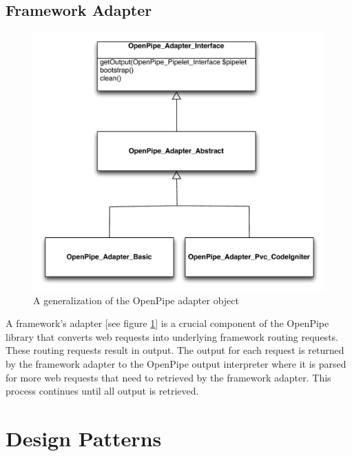 \documentclass[12pt]{report}
\begin{document}
\section{Framework Adapter}

\begin{figure}[H]
\label{fig:generalizationAdapter}
\centering
\includegraphics[width=\textwidth,keepaspectratio]{figures/images/generalization_adapters.pdf}
\caption{A generalization of the OpenPipe adapter object}
\end{figure}

A framework's adapter [see figure \ref{fig:generalizationAdapter}]  is a crucial component of the OpenPipe library that converts web requests into underlying framework routing requests. These routing requests result in output. The output for each request is returned by the framework adapter to the OpenPipe output interpreter where it is parsed for more web requests that need to retrieved by the framework adapter. This process continues until all output is retrieved.





\chapter{Design Patterns}
\end{document}

